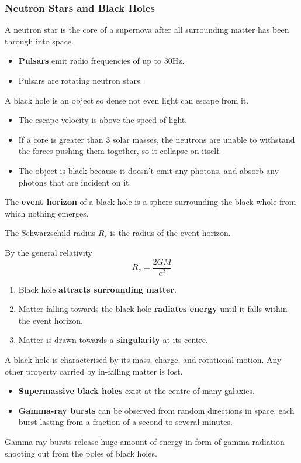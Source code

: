 \subsubsection*{Neutron Stars and Black Holes}

A neutron star is the core of a supernova after all surrounding matter has been through into space.
\begin{itemize}
    \item \textbf{Pulsars} emit radio frequencies of up to 30Hz.
    \item Pulsars are rotating neutron stars.
\end{itemize}

A black hole is an object so dense not even light can escape from it.
\begin{itemize}
    \item The escape velocity is above the speed of light.
    \item If a core is greater than 3 solar masses, the neutrons are unable to withstand the forces pushing them together, so it collapse on itself.
    \item The object is black because it doesn't emit any photons, and absorb any photons that are incident on it.
\end{itemize}

The \textbf{event horizon} of a black hole is a sphere surrounding the black whole from which nothing emerges.

The Schwarzschild radius $R_s$ is the radius of the event horizon.

By the general relativity
$$R_s=\frac{2GM}{c^2}$$
\begin{enumerate}
    \item Black hole \textbf{attracts surrounding matter}.
    \item Matter falling towards the black hole \textbf{radiates energy} until it falls within the event horizon.
    \item Matter is drawn towards a \textbf{singularity} at its centre.
\end{enumerate}

A black hole is characterised by its mass, charge, and rotational motion. Any other property carried by in-falling matter is lost.

\begin{itemize}
    \item \textbf{Supermassive black holes} exist at the centre of many galaxies.
    \item \textbf{Gamma-ray bursts} can be observed from random directions in space, each burst lasting from a fraction of a second to several minutes.
\end{itemize}

Gamma-ray bursts release huge amount of energy in form of gamma radiation shooting out from the poles of black holes.
